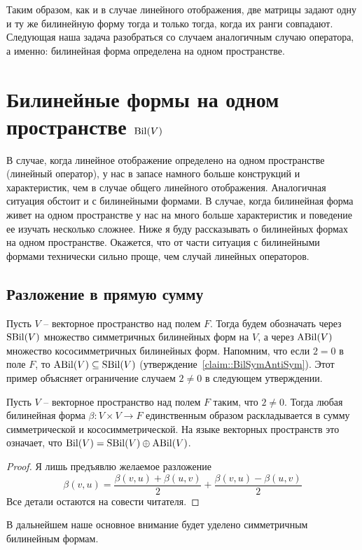 Таким образом, как и в случае линейного отображения, две матрицы задают одну и ту же билинейную форму тогда и только тогда, когда их ранги совпадают. Следующая наша задача разобраться со случаем аналогичным случаю оператора, а именно: билинейная форма определена на одном пространстве.

\newpage
\section{Билинейные формы на одном пространстве $\operatorname{Bil}(V)$}

В случае, когда линейное отображение определено на одном пространстве (линейный оператор), у нас в запасе намного больше конструкций и характеристик, чем в случае общего линейного отображения. Аналогичная ситуация обстоит и с билинейными формами. В случае, когда билинейная форма живет на одном пространстве у нас на много больше характеристик и поведение ее изучать несколько сложнее. Ниже я буду рассказывать о билинейных формах на одном пространстве. Окажется, что от части ситуация с билинейными формами технически сильно проще, чем случай линейных операторов.

\subsection{Разложение в прямую сумму}

Пусть $V$ -- векторное пространство над полем $F$. Тогда будем обозначать через $\operatorname{SBil}(V)$ множество симметричных билинейных форм на $V$, а через $\operatorname{ABil}(V)$ множество кососимметричных билинейных форм. Напомним, что если $2 = 0$ в поле $F$, то $\operatorname{ABil}(V)\subseteq \operatorname{SBil}(V)$ (утверждение~\ref{claim::BilSymAntiSym}). Этот пример объясняет ограничение случаем $2 \neq 0$ в следующем утверждении.

\begin{claim}
Пусть $V$ -- векторное пространство над полем $F$ таким, что $2 \neq 0$. Тогда любая билинейная форма $\beta\colon V\times V\to F$ единственным образом раскладывается в сумму симметрической и кососимметрической. На языке векторных пространств это означает, что $\operatorname{Bil}(V) = \operatorname{SBil}(V) \oplus \operatorname{ABil}(V)$.
\end{claim}
\begin{proof}
Я лишь предъявлю желаемое разложение 
\[
\beta(v,u) = \frac{\beta(v,u) + \beta(u, v)}{2} + \frac{\beta(v,u) - \beta(u,v)}{2}
\]
Все детали остаются на совести читателя.
\end{proof}

В дальнейшем наше основное внимание будет уделено симметричным билинейным формам.